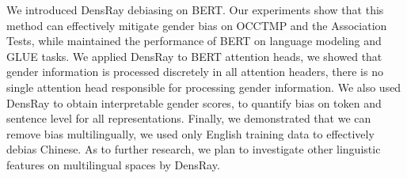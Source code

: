 We introduced DensRay debiasing on BERT. Our experiments
show that this method can effectively mitigate gender bias on OCCTMP and the Association Tests, while maintained the performance of BERT on language modeling and GLUE tasks. We applied DensRay to BERT attention heads, we showed that gender information is processed discretely in all attention headers, there is no single attention head responsible for processing gender information. We also used DensRay to obtain interpretable gender scores, to quantify bias on token and sentence level for all representations. Finally, we demonstrated that we can remove bias multilingually, we used only English training data to effectively debias Chinese. As to further research, we plan to investigate other linguistic features on multilingual spaces by DensRay.


